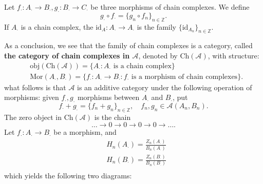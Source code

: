 \documentclass[../category_theory.tex]{subfiles}
\begin{document}
Let \(f_{\cdot }:A_{\cdot }\rightarrow B_{\cdot }, g_{\cdot }:B_{\cdot }\rightarrow C_{\cdot }\) be three morphisms of chain complexes. We define
\[
	g_{\cdot }\circ f_{\cdot }=\{g_{n}\circ f_{n}\}_{n\in \mathbb{Z}}.
\]
If \(A_{\cdot }\) is a chain complex, the \(\mathrm{id}_{A}:A_{\cdot }\rightarrow A_{\cdot }\) is the family \(\{\mathrm{id}_{A_{n}}\}_{n\in \mathbb{Z}}\).

As a conclusion, we see that the family of chain complexes is a category, called \textbf{the category of chain complexes in \(\mathcal{A}\)}, denoted by \(\mathrm{Ch}(\mathcal{A})\), with structure:
\begin{align*}
	 & \mathrm{obj}(\mathrm{Ch}(\mathcal{A}))=\{A_{\cdot }: A_{\cdot }\text{ is a chain complex}\}                                               \\
	 & \mathrm{Mor}(A_{\cdot }, B_{\cdot })=\{f_{\cdot }:A_{\cdot }\rightarrow B_{\cdot }: f_{\cdot }\text{ is a morphism of chain complexes}\}.
\end{align*}
what follows is that \(\mathcal{A}\) is an additive category under the following operation of morphisms: given \(f_{\cdot }, g_{\cdot }\) morphisms between \(A_{\cdot }\) and \(B_{\cdot }\), put
\[
	f_{\cdot }+g_{\cdot }=\{f_{n}+g_n\}_{n\in \mathbb{Z}},\quad f_{n}, g_{n}\in \mathcal{A}(A_{n}, B_{n}).
\]
The zero object in \(\mathrm{Ch}(\mathcal{A})\) is the chain
\[
	\dotsc \rightarrow 0\rightarrow 0\rightarrow 0\rightarrow 0\rightarrow \dotsc .
\]
Let \(f_{\cdot }:A_{\cdot }\rightarrow B_{\cdot }\) be a morphism, and
\begin{align*}
	 & H_{n}(A_{\cdot })=\frac{Z_{n}(A_{\cdot })}{B_{n}(A_{\cdot})} \\
	 & H_{n}(B_{\cdot })=\frac{Z_{n}(B_{\cdot })}{B_{n}(B_{\cdot})} \\
\end{align*}
which yields the following two diagrams:
\begin{center}
\end{center}
\end{document}
